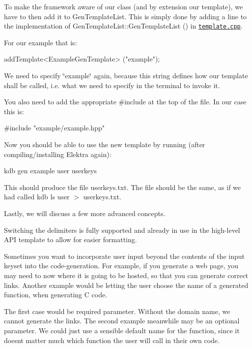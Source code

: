 To make the framework aware of our class (and by extension our template), we have to then add it to {\ttfamily Gen\+Template\+List}. This is simply done by adding a line to the implementation of {\ttfamily Gen\+Template\+List\+::\+Gen\+Template\+List ()} in \href{/home/jenkins/workspace/libelektra-release/src/tools/kdb/gen/template.cpp}{\tt {\ttfamily template.\+cpp}}.

For our example that is\+:


\begin{DoxyCode}
addTemplate<ExampleGenTemplate> (\textcolor{stringliteral}{"example"});
\end{DoxyCode}


We need to specify {\ttfamily \char`\"{}example\char`\"{}} again, because this string defines how our template shall be called, i.\+e. what we need to specify in the terminal to invoke it.

You also need to add the appropriate {\ttfamily \#include} at the top of the file. In our case this is\+:


\begin{DoxyCode}
\textcolor{preprocessor}{#include "example/example.hpp"}
\end{DoxyCode}


Now you should be able to use the new template by running (after compiling/installing Elektra again)\+:


\begin{DoxyCode}
kdb gen example user userkeys
\end{DoxyCode}


This should produce the file {\ttfamily userkeys.\+txt}. The file should be the same, as if we had called {\ttfamily kdb ls user $>$ userkeys.\+txt}.

Lastly, we will discuss a few more advanced concepts.

Switching the delimiters is fully supported and already in use in the high-\/level A\+PI template to allow for easier formatting.

Sometimes you want to incorporate user input beyond the contents of the input keyset into the code-\/generation. For example, if you generate a web page, you may need to now where it is going to be hosted, so that you can generate correct links. Another example would be letting the user choose the name of a generated function, when generating C code.

The first case would be required parameter. Without the domain name, we cannot generate the links. The second example meanwhile may be an optional parameter. We could just use a sensible default name for the function, since it doesn\textquotesingle{}t matter much which function the user will call in their own code.


